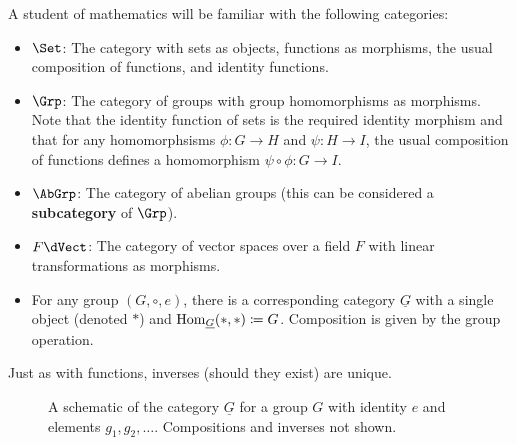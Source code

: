 \documentclass[12pt,twoside,draft]{reedthesis}
\let\oldindex\index
\renewcommand{\index}[1]{\oldindex{#1}\marginpar{\footnotesize\color{index}index: #1}}
\newcommand{\define}[1]{\textbf{#1}} %
\begin{document}

\begin{example}
  A student of mathematics will be familiar with the following categories:
  \begin{itemize}
    \itemsep-0.2em
    \item $\Set$: The category with sets as objects, functions as morphisms, 
      the usual composition of functions, and identity functions.
    \item $\Grp$: The category of groups with group homomorphisms
      as morphisms. Note that the identity function of sets is the required
      identity morphism and that for any homomorphsisms $\phi:G\to H$ and
      $\psi:H\to I$, the usual composition of functions defines a homomorphism
      $\psi\circ \phi:G\to I$.
    \item $\AbGrp$: The category of abelian groups (this can be considered a
      \define{subcategory} of $\Grp$).
    \item $F\dVect$: The category of vector spaces over a
      field $F$ with linear transformations as morphisms.
    \item For any group $(G,\circ,e)$, there is a corresponding category
      $\underline{G}$ with a single object (denoted $\ast$) and
      $\operatorname{Hom}_{\underline{G}}(\ast,\ast)\coloneqq G$. Composition is given by the
      group operation.
  \end{itemize}
\end{example}


Just as with functions, inverses (should they exist) are unique.

\begin{figure}[ht]
  \centering
  \caption{
    \label{fig:grp} A schematic of the category $\underline{G}$ for a
    group $G$ with identity $e$ and elements $g_1,g_2,\ldots$. Compositions and
    inverses not shown.
  }
\end{figure}
\end{document}
